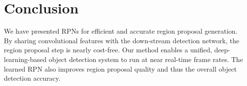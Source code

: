 \documentclass[10pt,journal,cspaper,compsoc]{IEEEtran}
\begin{document}
\section{Conclusion}

We have presented RPNs for efficient and accurate region proposal generation. By sharing convolutional features with the down-stream detection network, the region proposal step is nearly cost-free. Our method enables a unified, deep-learning-based object detection system to run at near real-time frame rates. The learned RPN also improves region proposal quality and thus the overall object detection accuracy.



\end{document}
